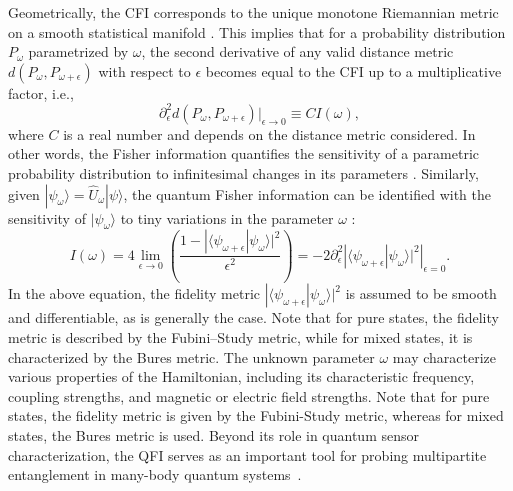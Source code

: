 \documentclass[amsmath,nobibnotes,aps,amssymb,pra, prl,aps,showpacs,superscriptaddress,twocolumn, longbibliography, reprint]{revtex4-2}
\begin{document}
Geometrically, the CFI corresponds to the unique monotone Riemannian metric on a smooth statistical manifold \cite{chentsov1982statiscal, morozova1991markov}. This implies that for a probability distribution $P_\omega$ parametrized by $\omega$, the second derivative of any valid distance metric $d(P_\omega, P_{\omega+\epsilon})$ with respect to $\epsilon$ becomes equal to the CFI up to a multiplicative factor, i.e., 
\begin{equation}
\partial^2_{\epsilon}d(P_\omega, P_{\omega+\epsilon})|_{\epsilon\rightarrow 0}\equiv C I(\omega), 
\end{equation}
where $C$ is a real number and depends on the distance metric considered. In other words, the Fisher information quantifies the sensitivity of a parametric probability distribution to infinitesimal changes in its parameters \cite{meyer2021fisher}. Similarly, given $|\psi_{\omega}\rangle=\hat{U}_{\omega}|\psi\rangle$, the quantum Fisher information can be identified with the sensitivity of $|\psi_{\omega}\rangle$ to tiny variations in the parameter $\omega$ \cite{helstrom1969quantum, braunstein1994statistical}:
\begin{equation}\label{QFI_ofig}
I(\omega)= 4\lim_{\epsilon\rightarrow 0}\left( \dfrac{1-|\langle\psi_{\omega+\epsilon}|\psi_\omega\rangle|^2}{\epsilon^2} \right)
=\left. -2\partial^2_{\epsilon}|\langle \psi_{\omega+\epsilon}|\psi_\omega \rangle|^2\right|_{\epsilon=0}. 
\end{equation}
In the above equation, the fidelity metric $|\langle\psi_{\omega+\epsilon}|\psi_\omega\rangle|^2$ is assumed to be smooth and differentiable, as is generally the case. Note that for pure states, the fidelity metric is described by the Fubini--Study metric, while for mixed states, it is characterized by the Bures metric. The unknown parameter $\omega$ may characterize various properties of the Hamiltonian, including its characteristic frequency, coupling strengths, and magnetic or electric field strengths. Note that for pure states, the fidelity metric is given by the Fubini-Study metric, whereas for mixed states, the Bures metric is used. Beyond its role in quantum sensor characterization, the QFI serves as an important tool for probing multipartite entanglement in many-body quantum systems~\cite{PhysRevA.85.022321, PhysRevA.85.022322, doi:10.1126/science.1250147, hauke2016measuring}. 
\end{document}
